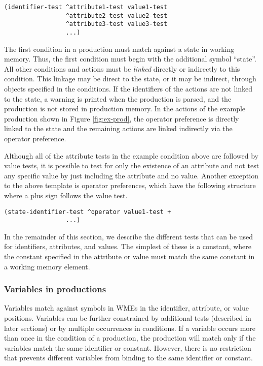 \begin{verbatim}
(identifier-test ^attribute1-test value1-test 
                 ^attribute2-test value2-test
                 ^attribute3-test value3-test
                 ...)
\end{verbatim}

The first condition in a production must match against a state in working memory.  Thus, the first condition must begin with the additional symbol ``state''.  All other conditions and actions must be \textit{linked} directly or indirectly to this condition. This linkage may be direct to the state, or it may be indirect, through objects specified in the conditions.  If the identifiers of the actions are not linked to the state, a warning is printed when the production is parsed, and the production is not stored in production memory.  In the actions of the example production shown in Figure \ref{fig:ex-prod}, the operator preference is directly linked to the state and the remaining actions are linked indirectly via the operator preference.

Although all of the attribute tests in the example condition above are followed by value tests, it is possible to test for only the existence of an attribute and not test any specific value by just including the attribute and no value.  Another exception to the above template is operator preferences, which have the following structure where a plus sign follows the value test.

\begin{verbatim}
(state-identifier-test ^operator value1-test +
                 ...)
\end{verbatim}

In the remainder of this section, we describe the different tests that can be used for identifiers, attributes, and values.  The simplest of these is a constant, where the constant specified in the attribute or value must match the same constant in a working memory element.

\subsubsection{Variables in productions}
\label{SYNTAX-pm-lhs-variables}

Variables match against symbols in WMEs in the identifier, attribute, or value positions.  Variables can be further constrained by additional tests (described in later sections) or by multiple occurrences in conditions.  If a variable occurs more than once in the condition of a production, the production will match only if the variables match the same identifier or constant.  However, there is no restriction that prevents different variables from binding to the same identifier or constant.

